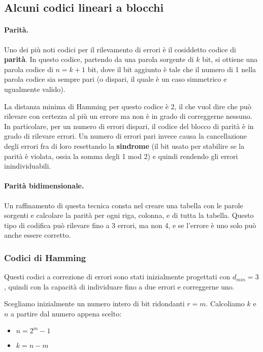     \subsection{Alcuni codici lineari a blocchi}
        \paragraph{Parità.} Uno dei più noti codici per il rilevamento di errori è il cosiddetto codice di \textbf{parità}. In questo codice, partendo da una parola sorgente di $k$ bit, si ottiene una parola codice di $n = k + 1$ bit, dove il bit aggiunto è tale che il numero di 1 nella parola codice sia sempre pari (o dispari, il quale è un caso simmetrico e ugualmente valido).
        
        La distanza minima di Hamming per questo codice è 2, il che vuol dire che può rilevare con certezza al più un errore ma non è in grado di correggerne nessuno. In particolare, per un numero di errori dispari, il codice del blocco di parità è in grado di rilevare errori. Un numero di errori pari invece causa la cancellazione degli errori fra di loro resettando la \textbf{sindrome} (il bit usato per stabilire se la parità è violata, ossia la somma degli 1 mod 2) e quindi rendendo gli errori inindividuabili.
        
        \paragraph{Parità bidimensionale.} Un raffinamento di questa tecnica consta nel creare una tabella con le parole sorgenti e calcolare la parità per ogni riga, colonna, e di tutta la tabella. Questo tipo di codifica può rilevare fino a 3 errori, ma non 4, e se l'errore è uno solo può anche essere corretto.
        
        \subsubsection{Codici di Hamming}
            Questi codici a correzione di errori sono stati inizialmente progettati con $d_{min} = 3$, quindi con la capacità di individuare fino a due errori e correggerne uno.
            
            Scegliamo inizialmente un numero intero di bit ridondanti $r = m$. Calcoliamo $k$ e $n$ a partire dal numero appena scelto:
            \begin{itemize}
                \item $n = 2^m - 1$
                \item $k = n - m$
            \end{itemize}
            
